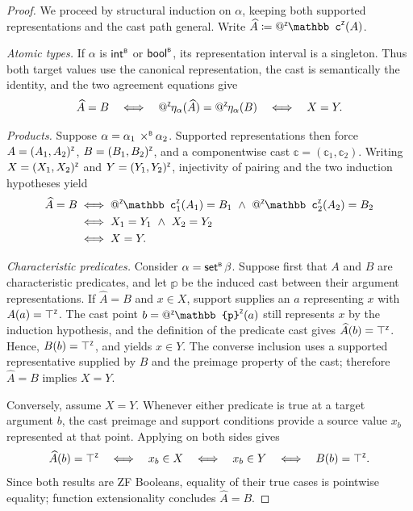 \begin{proof}
  We proceed by structural induction on \(\alpha\), keeping both supported
  representations and the cast path general.
  Write
  \(
    \widehat A\coloneq\appZ\zop{\mathbb c}(A)
  \).

  \emph{Atomic types.}
  If \(\alpha\) is \(\mathsf{int}^{\scriptscriptstyle{\mathsf{B}}}\) or \(\mathsf{bool}^{\scriptscriptstyle{\mathsf{B}}}\), its representation interval is a
  singleton.
  Thus both target values use the canonical representation, the cast is
  semantically the identity, and the two agreement equations give
  \[
    \widehat A=B
    \quad\Longleftrightarrow\quad
    \mathop{@^{\scriptscriptstyle{\mathsf{Z}}}}\mkern-4mu\eta_{\alpha}(\widehat A)
      =\mathop{@^{\scriptscriptstyle{\mathsf{Z}}}}\mkern-4mu\eta_{\alpha}(B)
    \quad\Longleftrightarrow\quad
    X=Y.
  \]

  \emph{Products.}
  Suppose \(\alpha=\alpha_1\mathbin{\,\times^{\scriptscriptstyle{\mathsf{B}}}}\alpha_2\).
  Supported representations then force
  \(A=\lparen A_1, A_2\rparen^{\scriptscriptstyle{\mathsf{Z}}}\), \(B=\lparen B_1, B_2\rparen^{\scriptscriptstyle{\mathsf{Z}}}\), and a componentwise cast
  \(\mathbb c=(\mathbb c_1,\mathbb c_2)\).
  Writing \(X=\lparen X_1, X_2\rparen^{\scriptscriptstyle{\mathsf{Z}}}\) and
  \(Y=\lparen Y_1, Y_2\rparen^{\scriptscriptstyle{\mathsf{Z}}}\), injectivity of pairing and the two induction
  hypotheses yield
  \[
    \begin{aligned}
      \widehat A=B
      &\iff
        \appZ\zop{\mathbb c_1}(A_1)=B_1
        \ \land\
        \appZ\zop{\mathbb c_2}(A_2)=B_2\\
      &\iff X_1=Y_1\ \land\ X_2=Y_2\\
      &\iff X=Y.
    \end{aligned}
  \]

  \emph{Characteristic predicates.}
  Consider \(\alpha=\mathsf{set}^{\scriptscriptstyle{\mathsf{B}}}\,\beta\).
  Suppose first that \(A\) and \(B\) are characteristic predicates, and let
  \(\mathbb{p}\) be the induced cast between their argument representations.
  If \(\widehat A=B\) and \(x\in X\), support supplies an \(a\) representing
  \(x\) with \(A(a)=\top^{\scriptscriptstyle{\mathsf{Z}}}\).
  The cast point \(b=\appZ\zop{\mathbb{p}}(a)\) still represents \(x\) by the induction
  hypothesis, and the definition of the predicate cast gives
  \(\widehat A(b)=\top^{\scriptscriptstyle{\mathsf{Z}}}\).
  Hence, \(B(b)=\top^{\scriptscriptstyle{\mathsf{Z}}}\), and
   yields \(x\in Y\).
  The converse inclusion uses a supported representative supplied by \(B\)
  and the preimage property of the cast; therefore
  \(\widehat A=B\) implies \(X=Y\).

  Conversely, assume \(X=Y\).
  Whenever either predicate is true at a target argument \(b\), the cast
  preimage and support conditions provide a source value \(x_b\) represented
  at that point.
  Applying  on both sides gives
  \[
    \widehat A(b)=\top^{\scriptscriptstyle{\mathsf{Z}}}
    \quad\Longleftrightarrow\quad
    x_b\in X
    \quad\Longleftrightarrow\quad
    x_b\in Y
    \quad\Longleftrightarrow\quad
    B(b)=\top^{\scriptscriptstyle{\mathsf{Z}}}.
  \]
  Since both results are ZF Booleans, equality of their true cases is
  pointwise equality; function extensionality concludes
  \(\widehat A=B\).


\end{proof}
